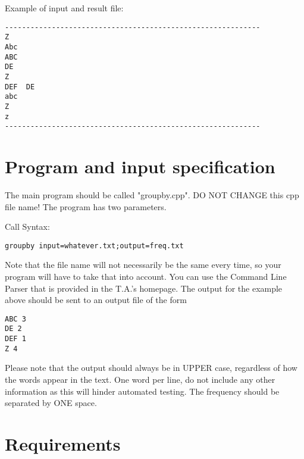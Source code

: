 Example of input and result file:
\begin{verbatim}
------------------------------------------------------------
Z
Abc
ABC
DE
Z
DEF  DE
abc
Z
z
------------------------------------------------------------
\end{verbatim}



\section{Program and input specification}

The main program should be called "groupby.cpp". DO NOT CHANGE this cpp file name!
The program has two parameters.

Call Syntax:
\begin{verbatim}
groupby input=whatever.txt;output=freq.txt
\end{verbatim}
Note that the file name will not necessarily be the same every time, so your program will have to take that into account. 
You can use the Command Line Parser that is provided in the T.A.'s homepage.
The output for the example above should be sent to an output file of the form

\begin{verbatim}
ABC 3
DE 2
DEF 1
Z 4
\end{verbatim}

Please note that the output should always be in UPPER case, 
regardless of how the words appear in the text.
One word per line, do not include any other information as this will hinder automated  testing.
The frequency should be separated by ONE space.

\section{Requirements}


